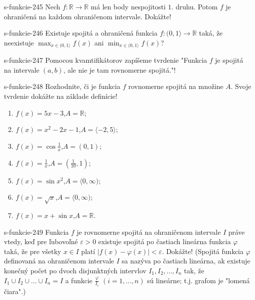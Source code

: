   \begin{defproblem}{s-funkcie-245}
  Nech $f: \mathbb{R} \rightarrow \mathbb{R}$ má len body nespojitosti $1.$ druhu. Potom $f$ je ohraničená na každom ohraničenom intervale. Dokážte!
  \end{defproblem}

  \begin{defproblem}{s-funkcie-246}
  Existuje spojitá a ohraničená funkcia $f:(0,1 \rangle \rightarrow \mathbb{R}$ taká, že neexistuje $\max_{x \in (0,1 \rangle} f(x)$ ani $\min_{x \in (0,1 \rangle} f(x)$?
  \end{defproblem}

  \begin{defproblem}{s-funkcie-247}
  Pomocou kvamtifikátorov zapíšeme tvrdenie "Funkcia $f$ je spojitá na intervale $(a,b)$, ale nie je tam rovnomerne spojitá."!
  \end{defproblem}

  \begin{defproblem}{s-funkcie-248}
  Rozhodnite, či je funkcia $f$ rovnomerne spojitá na množine $A$. Svoje tvrdenie dokážte na základe definície!
  \begin{enumerate}
  \item $f(x)=5x-3$,$A=\mathbb{R}$;
  \item $f(x)=x^2-2x-1$,$A=\langle -2,5 \rangle$;
  \item $f(x)=\cos \frac{1}{x}$,$A=(0,1)$;
  \item $f(x)=\frac{1}{x}$,$A=(\frac{1}{10},1)$;
  \item $f(x)=\sin x^2$,$A=\langle 0,\infty)$;
  \item $f(x)=\sqrt{x}$,$A=\langle 0,\infty)$;
  \item $f(x)=x+\sin x$,$A=\mathbb{R}$.
  \end{enumerate}
  \end{defproblem}

  \begin{defproblem}{s-funkcie-249}
  Funkcia $f$ je rovnomerne spojitá na ohraničenom intervale $I$ práve vtedy, keď pre ľubovoľné $\varepsilon >0$ existuje spojitá po častiach lineárna funkcia $\varphi$ taká, že pre všetky $x \in I$ platí $|f(x)-\varphi(x)|< \varepsilon$. Dokážte! (Spojitá funkcia $\varphi$ definovaná na ohraničenom intervale $I$ sa nazýva po častiach lineárna, ak existuje konečný počet po dvoch disjunktných intervlov $I_1,I_2,...,I_n$ tak, že $I_1 \cup I_2 \cup ... \cup I_n=I$ a funkcie $\frac{\varphi}{I_i}$ $(i=1,...,n)$ sú lineárne; t.j. grafom je "lomená čiara".)
  \end{defproblem}

